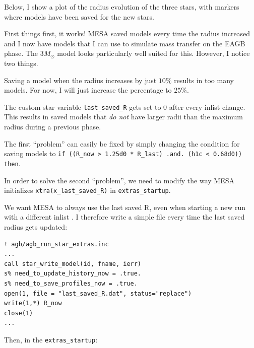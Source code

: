 \documentclass[a4paper,10pt]{article}
\begin{document}
    Below, I show a plot of the radius evolution of the three stars, with markers where models have been saved for the new stars.
    
    \begin{figure}[ht]
        \centering
    \end{figure}

    First things first, it works! MESA saved models every time the radius increased and I now have models that I can use to simulate mass transfer on the EAGB phase. The \(3M_\odot \) model looks particularly well suited for this.
    However, I notice two things.
    \begin{enumd}
        \item Saving a model when the radius increases by just \(10\%\) results in too many models. For now, I will just increase the percentage to \(25\%\).
        \item  The custom star variable \lstinline[style=output, breaklines=true]|last_saved_R| gets set to \(0\) after every inlist change. This results in saved models that \emph{do not} have larger radii than the maximum radius during a previous phase. 
\end{enumd}

    The first ``problem'' can easily be fixed by simply changing the condition for saving models to \texttt{if ((R_now > 1.25d0 * R_last) .and. (h1c < 0.68d0)) then}.


    In order to solve the second ``problem'', we need to modify the way MESA initializes \lstinline[style=output, breaklines=true]|xtra(x_last_saved_R)| in \lstinline[style=output, breaklines=true]|extras_startup|.

    We want MESA to always use the last saved R, even when starting a new run with a different inlist . I therefore write a simple file every time the last saved radius gets updated:
    \begin{verbatim}
! agb/agb_run_star_extras.inc
...
call star_write_model(id, fname, ierr)
s% need_to_update_history_now = .true.
s% need_to_save_profiles_now = .true.
open(1, file = "last_saved_R.dat", status="replace")
write(1,*) R_now
close(1)
...
    \end{verbatim}
    Then, in the \lstinline[style=output, breaklines=true]|extras_startup|:
\end{document}
